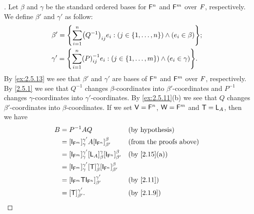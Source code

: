 \begin{proof}[]
	Let \(\beta\) and \(\gamma\) be the standard ordered bases for \(\mathsf{F}^n\) and \(\mathsf{F}^m\) over \(\mathit{F}\), respectively.
	We define \(\beta'\) and \(\gamma'\) as follow:
	\begin{align*}
		 & \beta' = \set{\sum_{i = 1}^n \pa{Q^{-1}}_{i j} e_i : (j \in \set{1, \dots, n}) \land (e_i \in \beta)};   \\
		 & \gamma' = \set{\sum_{i = 1}^n \pa{P}^{-1}_{i j} e_i : (j \in \set{1, \dots, m}) \land (e_i \in \gamma)}.
	\end{align*}
	By \cref{ex:2.5.13} we see that \(\beta'\) and \(\gamma'\) are bases of \(\mathsf{F}^n\) and \(\mathsf{F}^m\) over \(\mathit{F}\), respectively.
	By \cref{2.5.1} we see that \(Q^{-1}\) changes \(\beta\)-coordinates into \(\beta'\)-coordinates and \(P^{-1}\) changes \(\gamma\)-coordinates into \(\gamma'\)-coordinates.
	By \cref{ex:2.5.11}(b) we see that \(Q\) changes \(\beta'\)-coordinates into \(\beta\)-coordinates.
	If we set \(\mathsf{V} = \mathsf{F}^n\), \(\mathsf{W} = \mathsf{F}^m\) and \(\mathsf{T} = \mathsf{L}_A\), then we have
	\begin{align*}
		B & = P^{-1} A Q                                                                                  &  & \text{(by hypothesis)}         \\
		  & = [\IT[\vs{F}^m]]_{\gamma}^{\gamma'} A [\IT[\vs{F}^n]]_{\beta'}^{\beta}                       &  & \text{(from the proofs above)} \\
		  & = [\IT[\vs{F}^m]]_{\gamma}^{\gamma'} [\L_A]_{\beta}^{\gamma} [\IT[\vs{F}^n]]_{\beta'}^{\beta} &  & \by{2.15}[a]                   \\
		  & = [\IT[\vs{F}^m]]_{\gamma}^{\gamma'} [\T]_{\beta}^{\gamma} [\IT[\vs{F}^n]]_{\beta'}^{\beta}                                       \\
		  & = [\IT[\vs{F}^m] \T \IT[\vs{F}^n]]_{\beta'}^{\gamma'}                                         &  & \by{2.11}                      \\
		  & = [\T]_{\beta'}^{\gamma'}.                                                                    &  & \by{2.1.9}
	\end{align*}
\end{proof}
